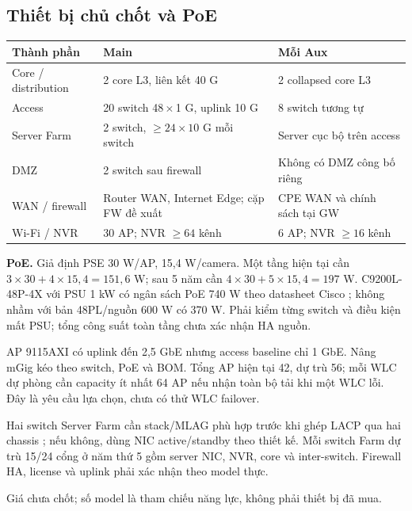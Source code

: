 \documentclass[
  11pt,
]{article}
\begin{document}
\subsection{Thiết bị chủ chốt và PoE}
\par\noindent
{}
\begin{tabularx}{\linewidth}{@{}lXX@{}}\toprule
Thành phần & Main & Mỗi Aux\\\midrule
Core / distribution & 2 core L3, liên kết 40 G & 2 collapsed core L3\\
Access & 20 switch 48\,$\times$\,1 G, uplink 10 G & 8 switch tương tự\\
Server Farm & 2 switch, $\ge24\times10$ G mỗi switch & Server cục bộ trên access\\
DMZ & 2 switch sau firewall & Không có DMZ công bố riêng\\
WAN / firewall & Router WAN, Internet Edge; cặp FW đề xuất & CPE WAN và chính sách tại GW\\
Wi-Fi / NVR & 30 AP; NVR $\ge64$ kênh & 6 AP; NVR $\ge16$ kênh\\\bottomrule\end{tabularx}\par

\textbf{PoE.} Giả định PSE 30 W/AP, 15,4 W/camera. Một tầng hiện tại cần $3\times30+4\times15,4=151,6$ W; sau 5 năm cần $4\times30+5\times15,4=197$ W. C9200L-48P-4X với PSU 1 kW có ngân sách PoE 740 W theo datasheet Cisco \cite{c9200}; không nhầm với bản 48PL/nguồn 600 W có 370 W. Phải kiểm từng switch và điều kiện mất PSU; tổng công suất toàn tầng chưa xác nhận HA nguồn.

AP 9115AXI có uplink đến 2,5 GbE \cite{c9115} nhưng access baseline chỉ 1 GbE. Nâng mGig kéo theo switch, PoE và BOM. Tổng AP hiện tại 42, dự trù 56; mỗi WLC dự phòng cần capacity ít nhất 64 AP nếu nhận toàn bộ tải khi một WLC lỗi. Đây là yêu cầu lựa chọn, chưa có thử WLC failover.

Hai switch Server Farm cần stack/MLAG phù hợp trước khi ghép LACP qua hai chassis \cite{etherchannel}; nếu không, dùng NIC active/standby theo thiết kế. Mỗi switch Farm dự trù 15/24 cổng ở năm thứ 5 gồm server NIC, NVR, core và inter-switch. Firewall HA, license và uplink phải xác nhận theo model thực.

Giá chưa chốt; số model là tham chiếu năng lực, không phải thiết bị đã mua.

\clearpage
\end{document}
